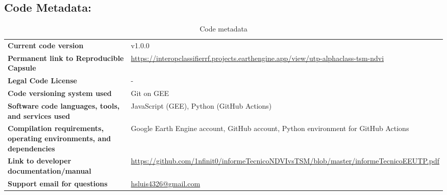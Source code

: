   \subsection*{\textbf{Code Metadata:}}
  \begin{table}[H]
    \scriptsize
    \setlength{\tabcolsep}{4pt}
    \begin{tabular}{p{}p{}}
      \hline
      \textbf{Current code version} & v1.0.0 \\


      \textbf{Permanent link to Reproducible Capsule} & \url{https://interopclassifierrf.projects.earthengine.app/view/utp-alphaclass-tsm-ndvi} \\

      \textbf{Legal Code License} & - \\

      \textbf{Code versioning system used} & Git on GEE \\

      \textbf{Software code languages, tools, and services used} & JavaScript (GEE), Python (GitHub Actions) \\

      \textbf{Compilation requirements, operating environments, and dependencies} & Google Earth Engine account, GitHub account, Python environment for GitHub Actions \\

      \textbf{Link to developer documentation/manual} & \url{https://github.com/1nfinit0/informeTecnicoNDVIvsTSM/blob/master/informeTecnicoEEUTP.pdf} \\

      \textbf{Support email for questions} & \url{hsluis4326@gmail.com} \\
      \hline
    \end{tabular}
    \caption{Code metadata}
  \end{table}

